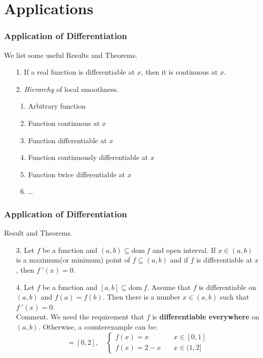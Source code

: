 \documentclass{beamer}
\begin{document}
\section{Applications}

\begin{frame}
    \frametitle{Application of Differentiation}
    We list some useful Results and Theorems.
    \begin{itemize}
        \item[1.] If a real function is differentiable at $x$, then it is continuous at $x$.
            \vspace{0.5em}
        \item[2.] \emph{Hierarchy} of local smoothness.
            \begin{enumerate}
                \item Arbitrary function
                \item Function continuous at $x$
                \item Function differentiable at $x$
                \item Function continuously differentiable at $x$
                \item Function twice differentiable at $x$
                \item \dots
            \end{enumerate}
    \end{itemize}


\end{frame}

\begin{frame}
    \frametitle{Application of Differentiation}
    Result and Theorems.\\
    \begin{enumerate}
        \item[3.] Let $f$ be a function and $(a,b)\subseteq \text{dom}\  f$ and open interval. If $x\in(a,b)$ is a
            maximum(or minimum) point of $f\subseteq(a,b)$ and if $f$ is differentiable at $x$, then $f~'(x)=0$.
            \vspace{0.5em}
        \item[4.] Let $f$ be a function and $[a,b]\subseteq \text{dom}\  f$. Assume that $f$ is differentiable on $(a,b)$ and
            $f(a)=f(b)$. Then there is a number $x\in(a,b)$ such that $f~'(x)=0$.\\
            \vspace{0.3em}
            Comment. We need the requirement that $f$ is \textbf{differentiable everywhere} on $(a,b)$. Otherwise, a
            counterexample can be:
            \begin{equation*}
                [a,b]=[0,2],\quad
                \begin{cases}
                    f(x)=x\qquad  & x\in[0,1] \\
                    f(x)=2-x\quad & x\in(1,2]
                \end{cases}
            \end{equation*}

    \end{enumerate}


\end{frame}
\end{document}
